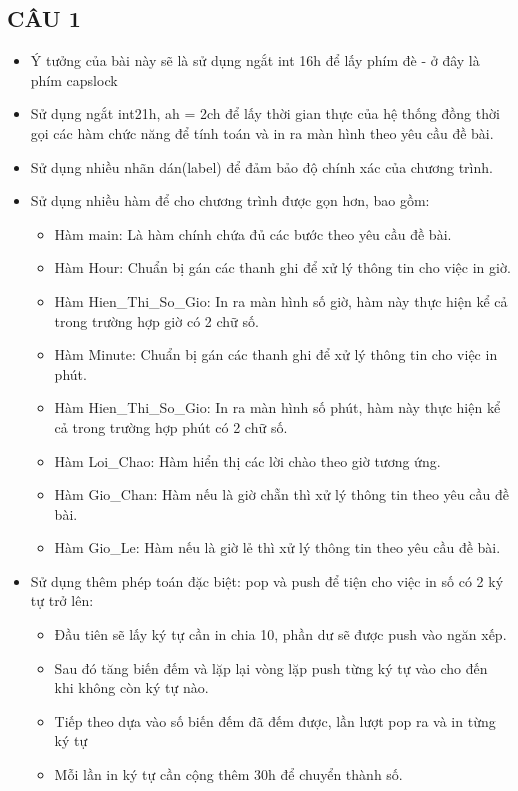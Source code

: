 \documentclass[12pt, a4paper]{article}
\begin{document}
\subsection{CÂU 1}
\begin{itemize}
    \item Ý tưởng của bài này sẽ là sử dụng ngắt int 16h để lấy phím đè - ở đây là phím capslock
    \item Sử dụng ngắt int21h, ah = 2ch để lấy thời gian thực của hệ thống đồng thời gọi các hàm chức năng để tính toán và in ra màn hình theo yêu cầu đề bài.
    \item Sử dụng nhiều nhãn dán(label) để đảm bảo độ chính xác của chương trình.
    \item Sử dụng nhiều hàm để cho chương trình được gọn hơn, bao gồm: 
    \begin{itemize}
        \item Hàm main: Là hàm chính chứa đủ các bước theo yêu cầu đề bài.
        \item Hàm Hour: Chuẩn bị gán các thanh ghi để xử lý thông tin cho việc in giờ.
        \item Hàm Hien\_Thi\_So\_Gio: In ra màn hình số giờ, hàm này thực hiện kể cả trong trường hợp giờ có 2 chữ số.
        \item Hàm Minute: Chuẩn bị gán các thanh ghi để xử lý thông tin cho việc in phút.
        \item Hàm Hien\_Thi\_So\_Gio: In ra màn hình số phút, hàm này thực hiện kể cả trong trường hợp phút có 2 chữ số.
        \item Hàm Loi\_Chao: Hàm hiển thị các lời chào theo giờ tương ứng.
        \item Hàm Gio\_Chan: Hàm nếu là giờ chẵn thì xử lý thông tin theo yêu cầu đề bài.
        \item Hàm Gio\_Le: Hàm nếu là giờ lẻ thì xử lý thông tin theo yêu cầu đề bài.
    \end{itemize}
    \item Sử dụng thêm phép toán đặc biệt: pop và push để tiện cho việc in số có 2 ký tự trở lên:
    \begin{itemize}
        \item Đầu tiên sẽ lấy ký tự cần in chia 10, phần dư sẽ được push vào ngăn xếp.
        \item Sau đó tăng biến đếm và lặp lại vòng lặp push từng ký tự vào cho đến khi không còn ký tự nào.
        \item Tiếp theo dựa vào số biến đếm đã đếm được, lần lượt pop ra và in từng ký tự
        \item Mỗi lần in ký tự cần cộng thêm 30h để chuyển thành số.

\end{itemize}
\end{itemize}
\end{document}

